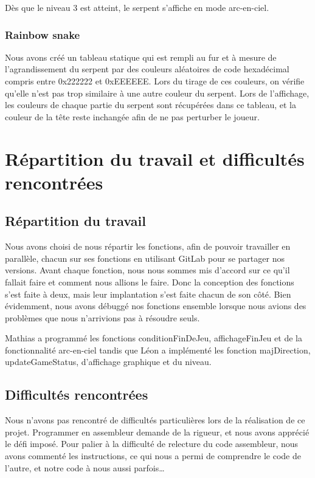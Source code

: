 \documentclass[a4paper]{article}
\begin{document}
Dès que le niveau 3 est atteint, le serpent s'affiche en mode arc-en-ciel.

\subsubsection*{Rainbow snake}
Nous avons créé un tableau statique qui est rempli au fur et à mesure de l'agrandissement du serpent par des couleurs aléatoires de code hexadécimal compris entre 
0x222222 et 0xEEEEEE. Lors du tirage de ces couleurs, on vérifie qu'elle n'est pas trop similaire à une autre couleur du serpent.
Lors de l'affichage, les couleurs de chaque partie du serpent sont récupérées dans ce tableau, et la couleur de la tête reste inchangée afin de ne pas perturber le joueur.

\section{Répartition du travail et difficultés rencontrées}

\subsection{Répartition du travail}
Nous avons choisi de nous répartir les fonctions, afin de pouvoir travailler en parallèle, chacun sur ses fonctions en utilisant GitLab pour se partager nos versions.
Avant chaque fonction, nous nous sommes mis d'accord sur ce qu'il fallait faire et comment nous allions le faire. Donc la conception des fonctions s'est faite à deux, mais
leur implantation s'est faite chacun de son côté. Bien évidemment, nous avons débuggé nos fonctions ensemble lorsque nous avions des problèmes que nous n'arrivions pas 
à résoudre seuls.

Mathias a programmé les fonctions conditionFinDeJeu, affichageFinJeu et de la fonctionnalité arc-en-ciel tandis que Léon a implémenté les fonction majDirection, 
updateGameStatus, d’affichage graphique et du niveau.

\subsection{Difficultés rencontrées}
Nous n'avons pas rencontré de difficultés particulières lors de la réalisation de ce projet. Programmer en assembleur demande de la rigueur, 
et nous avons apprécié le défi imposé.
Pour palier à la difficulté de relecture du code assembleur, nous avons commenté les instructions, ce qui nous a permi de comprendre le code de l'autre, 
et notre code à nous aussi parfois\dots
\end{document}
